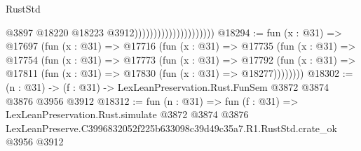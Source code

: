 \begin{lexlean}{RustStd}
\begin{coremodule}
                                              @3897
                                              @18220
                                              @18223
                                              @3912)))))))))))))))))))))
@18294 := fun (x : @31) =>
  @17697
    (fun (x : @31) =>
    @17716
      (fun (x : @31) =>
      @17735
        (fun (x : @31) =>
        @17754
          (fun (x : @31) =>
          @17773
            (fun (x : @31) =>
            @17792
              (fun (x : @31) => @17811 (fun (x : @31) => @17830 (fun (x : @31) => @18277))))))))
@18302 := (n : @31) -> (f : @31) -> LexLeanPreservation.Rust.FunSem @3872 @3874 @3876 @3956 @3912
@18312 := fun (n : @31) =>
  fun (f : @31) =>
  LexLeanPreservation.Rust.simulate
    @3872
    @3874
    @3876
    LexLeanPreserve.C3996832052f225b633098c39d49c35a7.R1.RustStd.crate_ok
    @3956
    @3912
\end{coremodule}
\end{lexlean}

